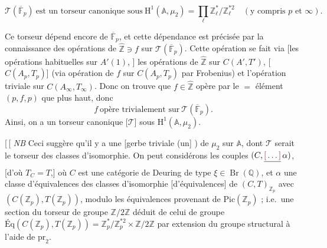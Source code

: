 \documentclass[11pt,a4paper]{article}
\begin{document}
\[
  \mathcal{T}(\overline{\mathbb{F}}_{p}) \ \text{est un torseur canonique
  sous} \ \mathrm{H}^{1}(\mathbb{A}, \mu_{2}) =
  \prod_{\ell} \mathbb{Z}_{\ell}^{*}/\mathbb{Z}_{\ell}^{*2} \quad
  (\text{y compris } p \text{ et } \infty) .
\]

Ce torseur  dépend encore de $\overline{\mathbb{F}}_{p}$,
\struck{\ill{}} et cette dépendance est précisée par la connaissance des
opérations de $\widehat{\mathbb{Z}} \ni f$ sur
$\mathcal{T}(\overline{\mathbb{F}}_{p})$. Cette opération se fait via
[les opérations habituelles sur $A'(1)$, \struck{\ill{}}] les opérations de
$\widehat{\mathbb{Z}}$ sur $C(A', T')$, \struck{[\ill{}]}
[$C(A_{p}, T_{p})$] (via opération de  $f$ sur
$C(A_{p}, T_{p})$ par Frobenius) et l'opération triviale sur
$C(A_{\infty}, T_{\infty})$. Donc on trouve que $f \in \widehat{\mathbb{Z}}$
opère par le $=$ élément $(p, f, p)$ que plus haut, donc
\[
  f \ \text{opère trivialement sur} \ \mathcal{T}(\overline{\mathbb{F}}_{p}) .
\]
Ainsi, on a un torseur canonique [$\mathcal{T}$] sous
$\mathrm{H}^{1}(\mathbb{A}, \mu_{2})$.


[\,[ \emph{NB} Ceci suggère qu'il y a une 
[gerbe triviale (un] ) de 
$\mu_{2}$ sur $\mathbb{A}$, dont $\mathcal{T}$ serait le torseur des
classes d'isomorphie. On peut  considérons les couples
$(C, \struck{\ill{}}\,\alpha)$, [d'où $T_{C} = T$,] où $C$ est une
catégorie de Deuring de type $\xi \in \operatorname{Br}(\mathbb{Q})$, et
$\alpha$ une \struck{\ill{}} classe d'équivalences des classes d'isomorphie
[d'équivalences] de $(C, T)_{\mathbb{Z}_{p}}$ avec
$(C(\mathbb{Z}_{p}), T(\mathbb{Z}_{p}))$, modulo les équivalences provenant
de $\mathrm{Pic}(\mathbb{Z}_{p})$ ; i.e.\ une
section du torseur de groupe $\mathbb{Z}/2\mathbb{Z}$ déduit de celui de
groupe
$\text{Éq}(C(\mathbb{Z}_{p}), T(\mathbb{Z}_{p})) =
\mathbb{Z}_{p}^{*}/\mathbb{Z}_{p}^{*2} \times \mathbb{Z}/2\mathbb{Z}$ par
extension du groupe structural à l'aide de $\mathrm{pr}_{2}$.
\end{document}
